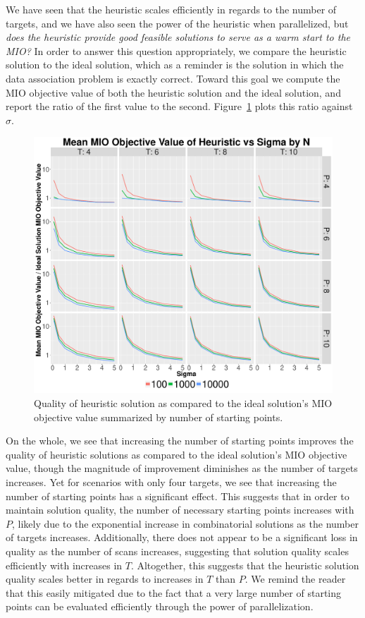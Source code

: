 We have seen that the heuristic scales efficiently in regards to the number of targets, and we have also seen the power of the heuristic when parallelized, but \textit{does the heuristic provide good feasible solutions to serve as a warm start to the MIO?} In order to answer this question appropriately, we compare the heuristic solution to the ideal solution, which as a reminder is the solution in which the data association problem is exactly correct. Toward this goal we compute the MIO objective value of both the heuristic solution and the ideal solution, and report the ratio of the first value to the second. Figure~\ref{fig:Basic_Heuristic_Objective} plots this ratio against $\sigma$.
\begin{figure}[ht]
  \centering
  \includegraphics[width=\columnwidth]{../Figures/Basic_Heuristic_Objective}
  \caption{Quality of heuristic solution as compared to the ideal solution's MIO objective value summarized by number of starting points.}
  \label{fig:Basic_Heuristic_Objective}
\end{figure}

On the whole, we see that increasing the number of starting points improves the quality of heuristic solutions as compared to the ideal solution's MIO objective value, though the magnitude of improvement diminishes as the number of targets increases. Yet for scenarios with only four targets, we see that increasing the number of starting points has a significant effect. This suggests that in order to maintain solution quality, the number of necessary starting points increases with $P$, likely due to the exponential increase in combinatorial solutions as the number of targets increases. Additionally, there does not appear to be a significant loss in quality as the number of scans increases, suggesting that solution quality scales efficiently with increases in $T$. Altogether, this suggests that the heuristic solution quality scales better in regards to increases in $T$ than $P$. We remind the reader that this easily mitigated due to the fact that a very large number of starting points can be evaluated efficiently through the power of parallelization. 

